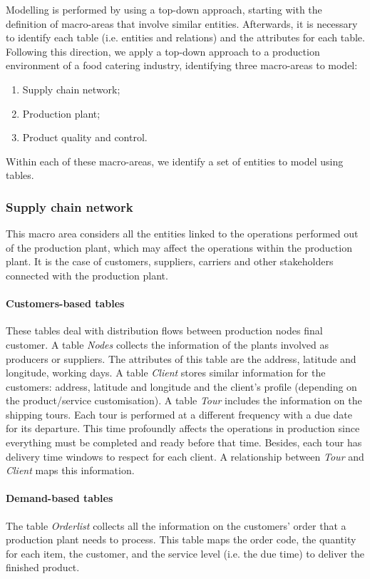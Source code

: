 Modelling is performed by using a top-down approach, starting with the definition of macro-areas that involve similar entities. Afterwards, it is necessary to identify each table (i.e. entities and relations) and the attributes for each table. Following this direction, we apply a top-down approach to a production environment of a food catering industry, identifying three macro-areas to model:

\begin{enumerate}
    \item Supply chain network;
    \item Production plant;
    \item Product quality and control.
\end{enumerate}

Within each of these macro-areas, we identify a set of entities to model using tables.

\subsubsection{Supply chain network}
This macro area considers all the entities linked to the operations performed out of the production plant, which may affect the operations within the production plant. It is the case of customers, suppliers, carriers and other stakeholders connected with the production plant.

\paragraph{Customers-based tables}
These tables deal with distribution flows between production nodes final customer. A table \textit{Nodes} collects the information of the plants involved as producers or suppliers. The attributes of this table are the address, latitude and longitude, working days.  A table \textit{Client} stores similar information for the customers: address, latitude and longitude and the client’s profile (depending on the product/service customisation). A table \textit{Tour} includes the information on the shipping tours. Each tour is performed at a different frequency with a due date for its departure. This time profoundly affects the operations in production since everything must be completed and ready before that time. Besides, each tour has delivery time windows to respect for each client. A relationship between \textit{Tour} and \textit{Client} maps this information.

\paragraph{Demand-based tables}
The table \textit{Orderlist} collects all the information on the customers' order that a production plant needs to process. This table maps the order code, the quantity for each item, the customer, and the service level (i.e. the due time) to deliver the finished product.

